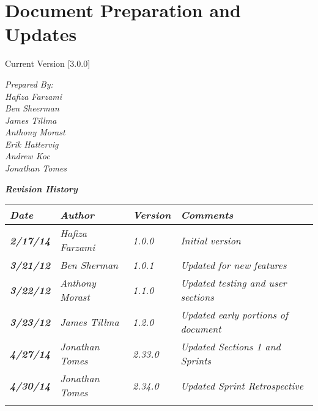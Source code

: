 
\chapter{Document Preparation and Updates}

Current Version [3.0.0]
\vspace*{5mm}

{\color{MSBlue3}
\noindent
\textit{Prepared By:}\\
\textit{Hafiza Farzami}\\
\textit{Ben Sheerman}\\
\textit{James Tillma}\\
\textit{Anthony Morast}\\
\textit{Erik Hattervig}\\
\textit{Andrew Koc}\\
\textit{Jonathan Tomes}\\
}

\vfill
\noindent
{\color{color02} \textit{\textbf{Revision History}}}\\
\begin{tabular}{|>{\raggedright}p{1.5cm}|>{\raggedright}p{3cm}|>{\raggedright}p{1.5cm}|>{\raggedright}p{9cm}|}
\hline
\textit{\textbf{Date}} &  \textit{\textbf{Author}} & \textit{\textbf{Version}} & \textit{\textbf{Comments}}\tabularnewline
\hline
 \textit{\textbf{2/17/14}} & \textit{Hafiza Farzami} & \textit{1.0.0} & \textit{Initial version}\tabularnewline
\hline
\textit{\textbf{3/21/12}} & \textit{Ben Sherman} & \textit{1.0.1} & \textit{Updated for new features}\tabularnewline
\hline
\textit{\textbf{3/22/12}} & \textit{Anthony Morast} & \textit{1.1.0} & \textit{Updated testing and user sections}\tabularnewline
 \hline
\textit{\textbf{3/23/12}} & \textit{James Tillma} & \textit{1.2.0} & \textit{Updated early portions of document}\tabularnewline
\hline
\textit{\textbf{4/27/14}} & \textit{Jonathan Tomes}  &\textit{2.33.0}  & \textit{Updated Sections 1 and Sprints} \tabularnewline
\hline
\textit{\textbf{4/30/14}} & \textit{Jonathan Tomes}  &\textit{2.34.0}  & \textit{Updated Sprint Retrospective} \tabularnewline
\hline
 &  &  & \tabularnewline
\hline
\end{tabular}
\vfill

